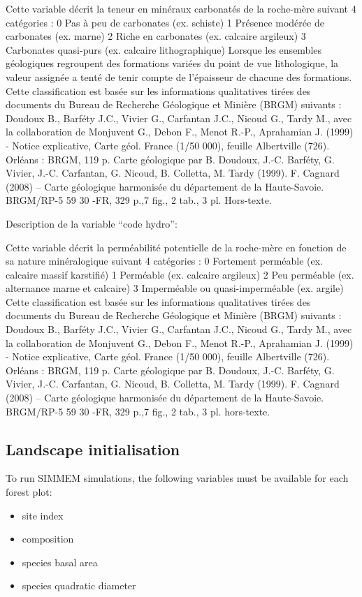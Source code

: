 \documentclass[a4paper]{article}
\begin{document}
Cette variable décrit la teneur en minéraux carbonatés de la roche-mère suivant 4 catégories :
0  Pas à peu de carbonates (ex. schiste)
1  Présence modérée de carbonates (ex. marne)
2  Riche en carbonates (ex. calcaire argileux)
3  Carbonates quasi-purs (ex. calcaire lithographique)
Lorsque les ensembles géologiques regroupent des formations variées du point de vue lithologique, la valeur assignée a tenté de tenir compte de l’épaisseur de chacune des formations.
Cette classification est basée sur les informations qualitatives tirées des documents du Bureau de Recherche Géologique et Minière (BRGM) suivants : 
Doudoux B., Barféty J.C., Vivier G., Carfantan J.C., Nicoud G., Tardy M., avec la collaboration de Monjuvent G., Debon F., Menot R.-P., Aprahamian J. (1999) - Notice explicative, Carte géol. France (1/50 000), feuille Albertville (726). Orléans : BRGM, 119 p. Carte géologique par B. Doudoux, J.-C. Barféty, G. Vivier, J.-C. Carfantan, G. Nicoud, B. Colletta, M. Tardy (1999).
F. Cagnard (2008) – Carte géologique harmonisée du département de la Haute-Savoie. BRGM/RP-5 59 30 -FR, 329 p.,7 fig., 2 tab., 3 pl. Hors-texte.

\noindent Description de la variable “code hydro”:

Cette variable décrit la perméabilité potentielle de la roche-mère en fonction de sa nature minéralogique suivant 4 catégories : 
0  Fortement perméable (ex. calcaire massif karstifié)
1  Perméable (ex. calcaire argileux)
2  Peu perméable (ex. alternance marne et calcaire)
3  Imperméable ou quasi-imperméable (ex. argile)
Cette classification est basée sur les informations qualitatives tirées des documents du Bureau de Recherche Géologique et Minière (BRGM) suivants : 
Doudoux B., Barféty J.C., Vivier G., Carfantan J.C., Nicoud G., Tardy M., avec la collaboration de Monjuvent G., Debon F., Menot R.-P., Aprahamian J. (1999) - Notice explicative, Carte géol. France (1/50 000), feuille Albertville (726). Orléans : BRGM, 119 p. Carte géologique par B. Doudoux, J.-C. Barféty, G. Vivier, J.-C. Carfantan, G. Nicoud, B. Colletta, M. Tardy (1999).
F. Cagnard (2008) – Carte géologique harmonisée du département de la Haute-Savoie. BRGM/RP-5 59 30 -FR, 329 p.,7 fig., 2 tab., 3 pl. hors-texte.

\subsection*{Landscape initialisation}
To run SIMMEM simulations, the following variables must be available for each forest plot:
\begin{itemize}
    \item site index
    \item composition
    \item species basal area
    \item species quadratic diameter
\end{itemize}
\end{document}
